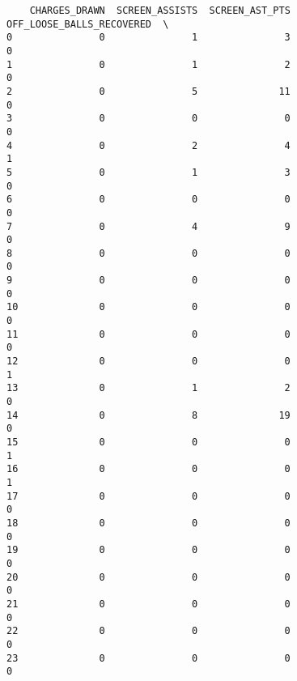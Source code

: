 \begin{verbatim}
    CHARGES_DRAWN  SCREEN_ASSISTS  SCREEN_AST_PTS  OFF_LOOSE_BALLS_RECOVERED  \
0               0               1               3                          0   
1               0               1               2                          0   
2               0               5              11                          0   
3               0               0               0                          0   
4               0               2               4                          1   
5               0               1               3                          0   
6               0               0               0                          0   
7               0               4               9                          0   
8               0               0               0                          0   
9               0               0               0                          0   
10              0               0               0                          0   
11              0               0               0                          0   
12              0               0               0                          1   
13              0               1               2                          0   
14              0               8              19                          0   
15              0               0               0                          1   
16              0               0               0                          1   
17              0               0               0                          0   
18              0               0               0                          0   
19              0               0               0                          0   
20              0               0               0                          0   
21              0               0               0                          0   
22              0               0               0                          0   
23              0               0               0                          0   


\end{verbatim}
